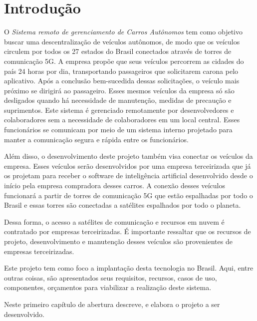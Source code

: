 

\chapter{ Introdu\c{c}\~{a}o}

O \textit{Sistema remoto de gerenciamento de Carros Autônomos} tem como objetivo buscar uma descentralização de veículos autônomos, de modo que os veículos circulem por todos os 27 estados do Brasil conectados através de torres de comunicação 5G.
A empresa propõe que seus veículos percorrem as cidades do país 24 horas por dia, transportando passageiros que solicitarem carona pelo aplicativo. Após a conclusão bem-sucedida dessas solicitações, o veículo mais próximo se dirigirá ao passageiro.
Esses mesmos veículos da empresa só são desligados quando há necessidade de manutenção, medidas de precaução e suprimentos. Este sistema é gerenciado remotamente por desenvolvedores e colaboradores sem a necessidade de colaboradores em um local central. Esses funcionários se comunicam por meio de um sistema interno projetado para manter a comunicação segura e rápida entre os funcionários.

Além disso, o desenvolvimento deste projeto também visa conectar os veículos da empresa. Esses veículos serão desenvolvidos por uma empresa terceirizada que já os projetam para receber o software de inteligência artificial desenvolvido desde o início pela empresa compradora desses carros. A conexão desses veículos funcionará a partir de torres de comunicação 5G que estão espalhadas por todo o Brasil e essas torres são conectadas a satélites espalhados por todo o planeta.

Dessa forma, o acesso a satélites de comunicação e recursos em nuvem é contratado por empresas terceirizadas.
É importante ressaltar que os recursos de projeto, desenvolvimento e manutenção desses veículos são provenientes de empresas terceirizadas.

Este projeto tem como foco a implantação desta tecnologia no Brasil. Aqui, entre outras coisas, são apresentados seus requisitos, recursos, casos de uso, componentes, orçamentos para viabilizar a realização deste sistema.



Neste primeiro capítulo de abertura descreve, e elabora o projeto a ser desenvolvido.



